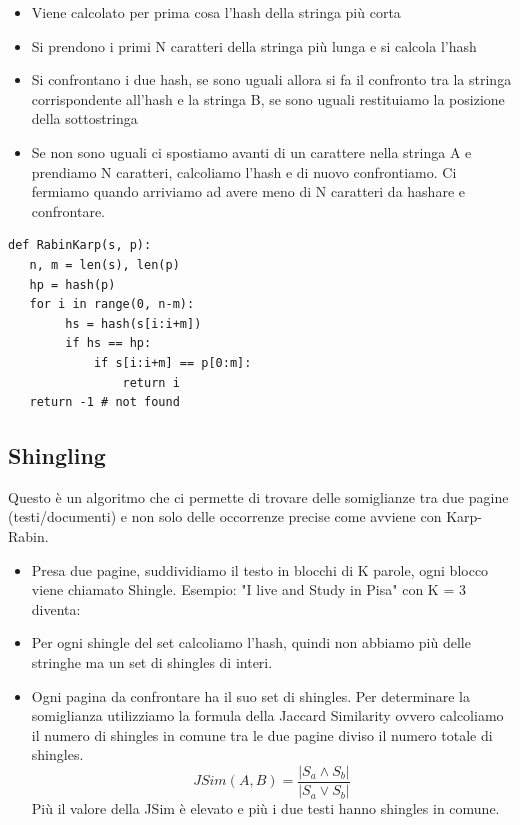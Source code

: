 \documentclass[14pt]{extreport}
\begin{document}
\begin{itemize}
    \item Viene calcolato per prima cosa l'hash della stringa più corta
    \item Si prendono i primi N caratteri della stringa più lunga e si calcola l'hash
    \item Si confrontano i due hash, se sono uguali allora si fa il confronto tra la stringa corrispondente all'hash e la stringa B, se sono uguali restituiamo la posizione della sottostringa
    \item Se non sono uguali ci spostiamo avanti di un carattere nella stringa A e prendiamo N caratteri, calcoliamo l'hash e di nuovo confrontiamo. Ci fermiamo quando arriviamo ad avere meno di N caratteri da hashare e confrontare.
\end{itemize}

\begin{lstlisting}
def RabinKarp(s, p):
   n, m = len(s), len(p)
   hp = hash(p)
   for i in range(0, n-m):
        hs = hash(s[i:i+m])
        if hs == hp:
            if s[i:i+m] == p[0:m]:
                return i
   return -1 # not found
\end{lstlisting}

\subsection{Shingling}

Questo è un algoritmo che ci permette di trovare delle somiglianze tra due pagine (testi/documenti) e non solo delle occorrenze precise come avviene con Karp-Rabin.

\begin{itemize}
    \item Presa due pagine, suddividiamo il testo in blocchi di K parole, ogni blocco viene chiamato Shingle.
    Esempio: "I live and Study in Pisa" con K = 3 diventa:
    \textrangle{}
    \item Per ogni shingle del set calcoliamo l'hash, quindi non abbiamo più delle stringhe ma un set di shingles di interi.
    \item Ogni pagina da confrontare ha il suo set di shingles. Per determinare la somiglianza utilizziamo la formula della Jaccard Similarity ovvero calcoliamo il numero di shingles in comune tra le due pagine diviso il numero totale di shingles.
    \begin{equation} 
    JSim(A,B) = \frac{|S_a \land S_b|}{|S_a \lor S_b|}
\end{equation}  
    Più il valore della JSim è elevato e più i due testi hanno shingles in comune.


\end{itemize}
\end{document}
